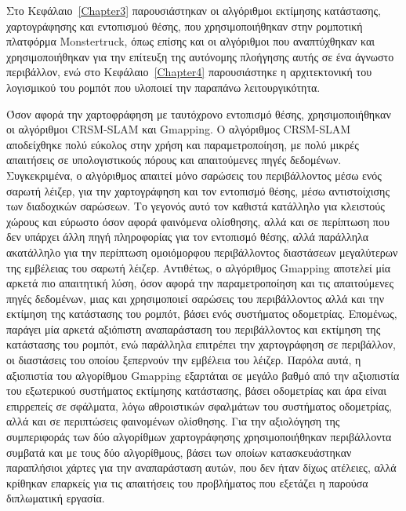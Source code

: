 \bigskip
Στο Κεφάλαιο~\ref{Chapter3} παρουσιάστηκαν οι αλγόριθμοι εκτίμησης κατάστασης, χαρτογράφησης και εντοπισμού θέσης, που χρησιμοποιήθηκαν στην ρομποτική πλατφόρμα Monstertruck, όπως επίσης και οι αλγόριθμοι που αναπτύχθηκαν και χρησιμοποιήθηκαν για την επίτευξη της αυτόνομης πλοήγησης αυτής σε ένα άγνωστο περιβάλλον, ενώ στο Κεφάλαιο~\ref{Chapter4} παρουσιάστηκε η αρχιτεκτονική του λογισμικού του ρομπότ που υλοποιεί την παραπάνω λειτουργικότητα.

\bigskip
Όσον αφορά την χαρτοφράφηση με ταυτόχρονο εντοπισμό θέσης, χρησιμοποιήθηκαν οι αλγόριθμοι CRSM-SLAM και Gmapping. Ο αλγόριθμος CRSM-SLAM αποδείχθηκε πολύ εύκολος στην χρήση και παραμετροποίηση, με πολύ μικρές απαιτήσεις σε υπολογιστικούς πόρους και απαιτούμενες πηγές δεδομένων. Συγκεκριμένα, ο αλγόριθμος απαιτεί μόνο σαρώσεις του περιβάλλοντος μέσω ενός σαρωτή λέιζερ, για την χαρτογράφηση και τον εντοπισμό θέσης, μέσω αντιστοίχισης των διαδοχικών σαρώσεων. Το γεγονός αυτό τον καθιστά κατάλληλο για κλειστούς χώρους και εύρωστο όσον αφορά φαινόμενα ολίσθησης, αλλά και σε περίπτωση που δεν υπάρχει άλλη πηγή πληροφορίας για τον εντοπισμό θέσης, αλλά παράλληλα ακατάλληλο για την περίπτωση ομοιόμορφου περιβάλλοντος διαστάσεων μεγαλύτερων της εμβέλειας του σαρωτή λέιζερ. Αντιθέτως, ο αλγόριθμος Gmapping αποτελεί μία αρκετά πιο απαιτητική λύση, όσον αφορά την παραμετροποίηση και τις απαιτούμενες πηγές δεδομένων, μιας και χρησιμοποιεί σαρώσεις του περιβάλλοντος αλλά και την εκτίμηση της κατάστασης του ρομπότ, βάσει ενός συστήματος οδομετρίας. Επομένως, παράγει μία αρκετά αξιόπιστη αναπαράσταση του περιβάλλοντος και εκτίμηση της κατάστασης του ρομπότ, ενώ παράλληλα επιτρέπει την χαρτογράφηση σε περιβάλλον, οι διαστάσεις του οποίου ξεπερνούν την εμβέλεια του λέιζερ. Παρόλα αυτά, η αξιοπιστία του αλγορίθμου Gmapping εξαρτάται σε μεγάλο βαθμό από την αξιοπιστία του εξωτερικού συστήματος εκτίμησης κατάστασης, βάσει οδομετρίας και άρα είναι επιρρεπείς σε σφάλματα, λόγω αθροιστικών σφαλμάτων του συστήματος οδομετρίας, αλλά και σε περιπτώσεις φαινομένων ολίσθησης. Για την αξιολόγηση της συμπεριφοράς των δύο αλγορίθμων χαρτογράφησης χρησιμοποιήθηκαν περιβάλλοντα συμβατά και με τους δύο αλγορίθμους, βάσει των οποίων κατασκευάστηκαν παραπλήσιοι χάρτες για την αναπαράσταση αυτών, που δεν ήταν δίχως ατέλειες, αλλά κρίθηκαν επαρκείς για τις απαιτήσεις του προβλήματος που εξετάζει η παρούσα διπλωματική εργασία.

